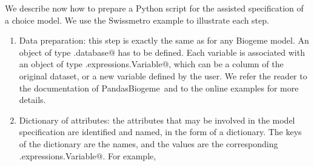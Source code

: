 \documentclass[12pt,a4paper]{article}
\newcommand{\PDBIOGEME}{PandasBiogeme}
\begin{document}
We describe now how to prepare a Python script for the assisted
specification of a choice model. We use the Swissmetro example to
illustrate each step.

\begin{enumerate}
\item \label{item:data}Data preparation: this step is exactly the same as for any
  Biogeme model. An object of type \lstinline@biogeme.database@ has to
  be defined. Each variable is associated with an object of type
  \lstinline@biogeme.expressions.Variable@, which can be a column of
  the original dataset, or a new variable defined by the user. We
  refer the reader to the documentation of \PDBIOGEME\ and to the
  online examples for more details.
\item \label{item:attributes}Dictionary of attributes: the attributes that may be involved in
  the model specification are identified and named, in the form of a
  dictionary. The keys of the dictionary are the names, and the values
  are the corresponding  \lstinline@biogeme.expressions.Variable@. For
  example,


\end{enumerate}
\end{document}
